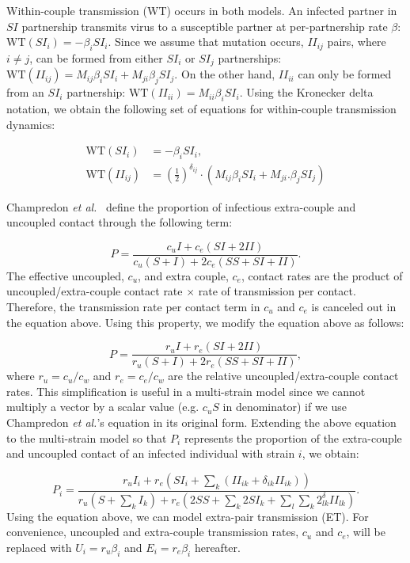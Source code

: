 \documentclass[10pt,letterpaper]{article}
\newcommand{\khalf}{\left(\frac{1}{2}\right)^{\delta_{ij}}}  %
\newcommand{\etal}{\textit{et al.}}
\newcommand{\WT}{\textrm{WT}}
\begin{document}
Within-couple transmission (WT) occurs in both models. An infected partner in $SI$ partnership transmits virus to a susceptible partner at per-partnership rate $\beta$: $\WT(SI_i) = - \beta_i SI_i$. Since we assume that mutation occurs, $II_{ij}$ pairs, where $i \neq j$, can be formed from either $SI_i$ or $SI_j$ partnerships: $\WT(II_{ij}) = M_{ij} \beta_i SI_i + M_{ji} \beta_j SI_j$. On the other hand, $II_{ii}$ can only be formed from an $SI_i$ partnership: $\WT(II_{ii}) = M_{ii} \beta_i SI_i$. Using the Kronecker delta notation, we obtain the following set of equations for within-couple transmission dynamics:

\begin{equation}
\begin{aligned}
\WT(SI_i) &= - \beta_i SI_i,\\
\WT(II_{ij}) &=  \khalf \cdot (M_{ij} \beta_i SI_i + M_{ji}. \beta_j SI_j)
\end{aligned}
\end{equation}

Champredon \etal\ \cite{champredon_hiv_2013} define the proportion of infectious extra-couple and uncoupled contact through the following term:

\begin{equation}
P = \frac{c_u I + c_e (SI + 2 II)}{c_u (S + I) + 2 c_e(SS + SI + II)}.
\end{equation}
The effective uncoupled, $c_u$, and extra couple, $c_e$, contact rates are the product of uncoupled/extra-couple contact rate $\times$ rate of transmission per contact. Therefore, the transmission rate per contact term in $c_u$ and $c_e$ is canceled out in the equation above. Using this property, we modify the equation above as follows:

\begin{equation}
P = \frac{r_u I + r_e (SI + 2 II)}{r_u (S + I) + 2 r_e(SS + SI + II)},
\end{equation}
where $r_u = c_u/c_w$ and $r_e = c_e/c_w$ are the relative uncoupled/extra-couple contact rates. This simplification is useful in a multi-strain model since we cannot multiply a vector by a scalar value (e.g. $c_u S$ in denominator) if we use Champredon \etal's equation in its original form. Extending the above equation to the multi-strain model so that $P_i$ represents the proportion of the extra-couple and uncoupled contact of an infected individual with strain $i$, we obtain:

\begin{equation}
P_i = \frac{r_u I_i + r_e (SI_i + \sum_k (II_{ik} + \delta_{ik} II_{ik}))}{r_u (S + \sum_k I_k) + r_e(2 SS + \sum_k 2 SI_k + \sum_l \sum_k 2^\delta_{lk} II_{lk} )}.
\end{equation}
Using the equation above, we can model extra-pair transmission (ET). For convenience, uncoupled and extra-couple transmission rates, $c_u$ and $c_e$, will be replaced with $U_i = r_u \beta_i$ and $E_i = r_e \beta_i$ hereafter.
\end{document}
